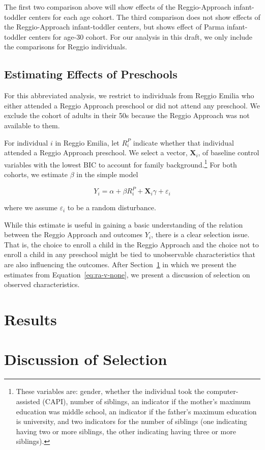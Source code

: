 The first two comparison above will show effects of the Reggio-Approach infant-toddler centers for each age cohort. The third comparison does not show effects of the Reggio-Approach infant-toddler centers, but shows effect of Parma infant-toddler centers for age-30 cohort. For our analysis in this draft, we only include the comparisons for Reggio individuals. 

\subsection{Estimating Effects of Preschools}
For this abbreviated analysis, we restrict to individuals from Reggio Emilia who either attended a Reggio Approach preschool or did not attend any preschool. We exclude the cohort of adults in their 50s because the Reggio Approach was not available to them.

For individual $i$ in Reggio Emilia, let $R_i^{P}$ indicate whether that individual attended a Reggio Approach preschool. We select a vector, $\bm{X}_i$, of baseline control variables with the lowest BIC to account for family background.\footnote{These variables are: gender, whether the individual took the computer-assisted (CAPI), number of siblings, an indicator if the mother's maximum education was middle school, an indicator if the father's maximum education is university, and two indicators for the number of siblings (one indicating having two or more siblings, the other indicating having three or more siblings).} For both cohorts, we estimate $\beta$ in the simple model

\begin{equation}
	Y_i = \alpha + \beta R_i^{P} + \bm{X}_i\gamma + \varepsilon_i
	\label{eq:ra-v-none}
\end{equation}

\noindent where we assume $\varepsilon_i$ to be a random disturbance. 

While this estimate is useful in gaining a basic understanding of the relation between the Reggio Approach and outcomes $Y_i$, there is a clear selection issue. That is, the choice to enroll a child in the Reggio Approach and the choice not to enroll a child in any preschool might be tied to unobservable characteristics that are also influencing the outcomes. After Section~\ref{sec:results} in which we present the estimates from Equation~\eqref{eq:ra-v-none}, we present a discussion of selection on observed characteristics.

\section{Results}
\label{sec:results}




\section{Discussion of Selection}
\label{sec:selection}



\clearpage

%
%


